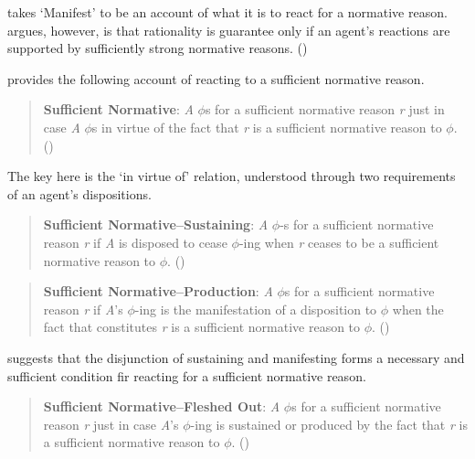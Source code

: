 \documentclass[10pt]{article}
\begin{document}
\citeauthor{Lord:2018aa} takes `Manifest' to be an account of what it is to react for a normative reason.
\citeauthor{Lord:2018aa} argues, however, is that rationality is guarantee only if an agent's reactions are supported by sufficiently strong normative reasons.
(\citeyear[141]{Lord:2018aa})

\citeauthor{Lord:2018aa} provides the following account of reacting to a sufficient normative reason.

\begin{quote}
  \textbf{Sufficient Normative}: \emph{A} \(\phi\)s for a sufficient normative reason \emph{r} just in case \emph{A} \(\phi\)s in virtue of the fact that \emph{r} is a sufficient normative reason to \(\phi\).\nolinebreak
  \mbox{}\hfill\mbox{(\citeyear[142]{Lord:2018aa})}
\end{quote}

The key here is the `in virtue of' relation, understood through two requirements of an agent's dispositions.

\begin{quote}
  \textbf{Sufficient Normative–Sustaining}: \emph{A} \(\phi\)-s for a sufficient normative reason \emph{r} if \emph{A} is disposed to cease \(\phi\)-ing when \emph{r} ceases to be a sufficient normative reason to \(\phi\).\nolinebreak
  \mbox{}\hfill\mbox{(\citeyear[142]{Lord:2018aa})}
\end{quote}

\begin{quote}
  \textbf{Sufficient Normative–Production}: \emph{A} \(\phi\)s for a sufficient normative reason \emph{r} if \emph{A}'s \(\phi\)-ing is the manifestation of a disposition to \(\phi\) when the fact that constitutes \emph{r} is a sufficient normative reason to \(\phi\).\nolinebreak
  \mbox{}\hfill\mbox{(\citeyear[142]{Lord:2018aa})}
\end{quote}

\citeauthor{Lord:2018aa} suggests that the disjunction of sustaining and manifesting forms a necessary and sufficient condition fir reacting for a sufficient normative reason.

\begin{quote}
  \textbf{Sufficient Normative–Fleshed Out}: \emph{A} \(\phi\)s for a sufficient normative reason \emph{r} just in case \emph{A}'s \(\phi\)-ing is sustained or produced by the fact that \emph{r} is a sufficient normative reason to \(\phi\).\nolinebreak
  \mbox{}\hfill\mbox{(\citeyear[143]{Lord:2018aa})}
\end{quote}
\end{document}
